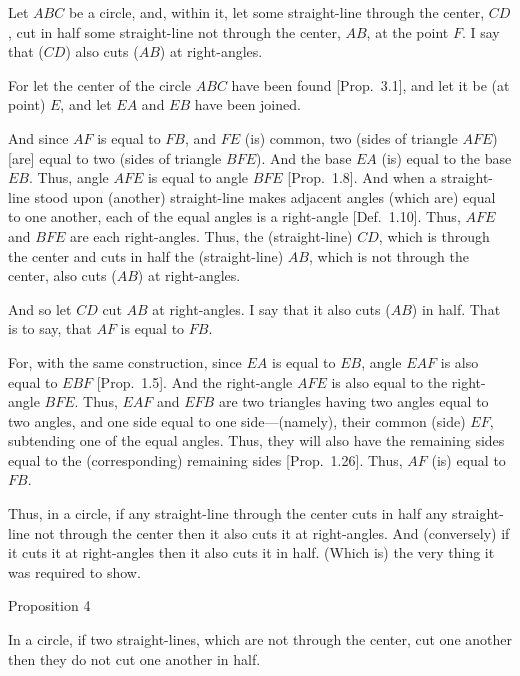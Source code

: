 Let $ABC$ be a circle, and, within it, let some straight-line through the center,
$CD$, 
cut in half some straight-line not through the center, $AB$, at the point $F$.
I say that ($CD$) also cuts ($AB$) at right-angles.

For let the center of the circle $ABC$ have been found [Prop.~3.1], and let it
be (at point) $E$, and let $EA$ and $EB$ have been joined.

And since  $AF$ is equal to $FB$, and $FE$ (is) common, two (sides  of triangle $AFE$) [are] equal to
two (sides of triangle $BFE$). And the base $EA$ (is) equal to the base $EB$. Thus, angle
$AFE$ is equal to angle $BFE$ [Prop.~1.8]. And when a straight-line
stood upon (another) straight-line makes adjacent angles (which are)
equal to one another, each of the equal angles is a right-angle [Def.~1.10].
Thus, $AFE$ and $BFE$ are each right-angles. Thus, the (straight-line) $CD$, which is
through the center
and cuts  in half the (straight-line) $AB$, which is not through the center, also cuts ($AB$) at right-angles.

\epsfysize=2.2in
\centerline{}

And so let $CD$ cut $AB$ at right-angles. I say that it also cuts ($AB$) in half.
That is to say, that $AF$ is equal to $FB$.

For, with the same construction, since $EA$ is equal to $EB$, angle $EAF$ is also
equal to $EBF$ [Prop.~1.5]. And the right-angle $AFE$ is also equal to the
right-angle $BFE$. Thus, $EAF$ and $EFB$ are two triangles having two angles
equal to two angles, and one side equal to one side---(namely), their common (side)
$EF$, subtending one of the equal angles. Thus, they will also have the remaining sides equal to the (corresponding) remaining sides [Prop.~1.26]. Thus, $AF$ (is) equal to $FB$.

Thus, in a circle, if any straight-line through the center cuts in half any straight-line
not through the center then it also cuts it at right-angles. And (conversely)
if it cuts it at right-angles then it also cuts it in half. (Which is) the very thing
it was required to show.


\begin{center}
{\large Proposition 4}
\end{center}

In a circle, if two straight-lines, which are not through the center, cut
one another then they do not cut one another in half.

